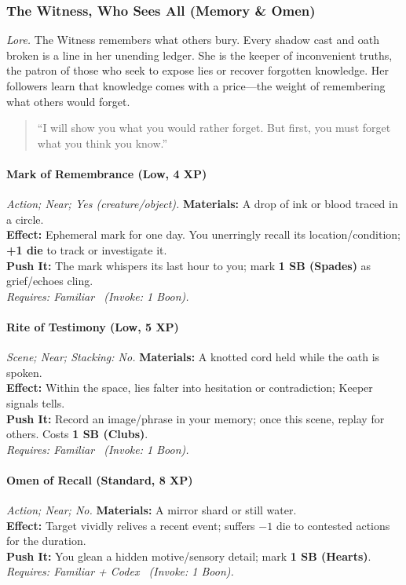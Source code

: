 \subsubsection{The Witness, Who Sees All (Memory \& Omen)}
\textit{Lore.} The Witness remembers what others bury. Every shadow cast and oath broken is a line in her unending ledger. She is the keeper of inconvenient truths, the patron of those who seek to expose lies or recover forgotten knowledge. Her followers learn that knowledge comes with a price—the weight of remembering what others would forget.

\begin{quote}
“I will show you what you would rather forget. But first, you must forget what you think you know.”
\end{quote}

\paragraph{Mark of Remembrance (Low, 4 XP)} \emph{Action; Near; Yes (creature/object).}
\textbf{Materials:} A drop of ink or blood traced in a circle.\\
\textbf{Effect:} Ephemeral mark for one day. You unerringly recall its location/condition; \textbf{+1 die} to track or investigate it.\\
\textbf{Push It:} The mark whispers its last hour to you; mark \textbf{1 SB (Spades)} as grief/echoes cling.\\
\emph{Requires: Familiar \ (\textit{Invoke:} 1 Boon).}

\paragraph{Rite of Testimony (Low, 5 XP)} \emph{Scene; Near; Stacking: No.}
\textbf{Materials:} A knotted cord held while the oath is spoken.\\
\textbf{Effect:} Within the space, lies falter into hesitation or contradiction; Keeper signals tells.\\
\textbf{Push It:} Record an image/phrase in your memory; once this scene, replay for others. Costs \textbf{1 SB (Clubs)}.\\
\emph{Requires: Familiar \ (\textit{Invoke:} 1 Boon).}

\paragraph{Omen of Recall (Standard, 8 XP)} \emph{Action; Near; No.}
\textbf{Materials:} A mirror shard or still water.\\
\textbf{Effect:} Target vividly relives a recent event; suffers \(-1\) die to contested actions for the duration.\\
\textbf{Push It:} You glean a hidden motive/sensory detail; mark \textbf{1 SB (Hearts)}.\\
\emph{Requires: Familiar + Codex \ (\textit{Invoke:} 1 Boon).}

